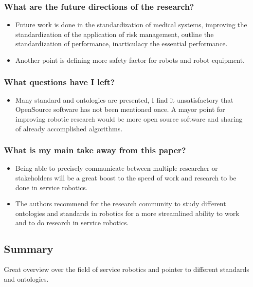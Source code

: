     \subsubsection*{What are the future directions of the research?}
    \begin{itemize}
        \item Future work is done in the standardization of medical systems, improving the standardization of the application of risk management, outline the standardization of performance, inarticulacy the essential performance.
        \item Another point is defining more safety factor for robots and robot equipment.
    \end{itemize}
    \subsubsection*{What questions have I left?}
    \begin{itemize}
        \item Many standard and ontologies are presented, I find it unsatisfactory that OpenSource software has not been mentioned once. A mayor point for improving robotic research would be more open source software and sharing of already accomplished algorithms.
    \end{itemize}
    \subsubsection*{What is my main take away from this paper?}
    \begin{itemize}
        \item Being able to precisely communicate between multiple researcher or stakeholders will be a great boost to the speed of work and research to be done in service robotics.
        \item The authors recommend for the research community to study different ontologies and standards in robotics for a more streamlined ability to work and to do research in service robotics.
    \end{itemize}
    
    \subsection*{Summary}
    Great overview over the field of service robotics and pointer to different standards and ontologies.
    

    \newpage
    
